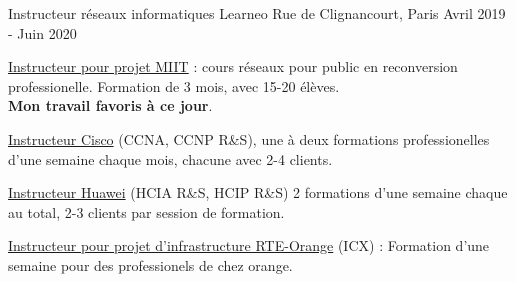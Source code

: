 \begin{cventries}
  \cventry
    {Instructeur réseaux informatiques} %
    {Learneo} %
    {Rue de Clignancourt, Paris} %
    {Avril 2019 - Juin 2020} %
    {
      \begin{cvitems} %
      {
        \item {\underline{Instructeur pour projet MIIT} : cours réseaux pour public en reconversion professionelle. Formation de 3 mois, avec 15-20 élèves.\\\textbf{Mon travail favoris à ce jour}.}
        \item {\underline{Instructeur Cisco} (CCNA, CCNP R\&S), une à deux formations professionelles d'une semaine chaque mois, chacune avec 2-4 clients.}
        \item {\underline{Instructeur Huawei} (HCIA R\&S, HCIP R\&S) 2 formations d'une semaine chaque au total, 2-3 clients par session de formation.}
        \item {\underline{Instructeur pour projet d'infrastructure RTE-Orange} (ICX) : Formation d'une semaine pour des professionels de chez orange.}
      }
      \end{cvitems}
    }
\end{cventries}
